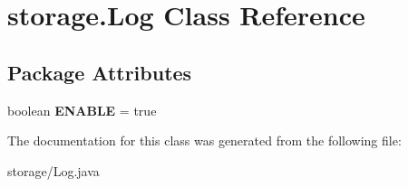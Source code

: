 \hypertarget{classstorage_1_1_log}{
\section{storage.\-Log \-Class \-Reference}
\label{classstorage_1_1_log}
}
\subsection*{\-Package \-Attributes}
\begin{DoxyCompactItemize}
\item 
\hypertarget{classstorage_1_1_log_ad9cee9ec3408305f72aeb2389face96a}{
boolean {\bfseries \-E\-N\-A\-B\-L\-E} = true}
\label{classstorage_1_1_log_ad9cee9ec3408305f72aeb2389face96a}

\end{DoxyCompactItemize}


\-The documentation for this class was generated from the following file\-:\begin{DoxyCompactItemize}
\item 
storage/\-Log.\-java\end{DoxyCompactItemize}
